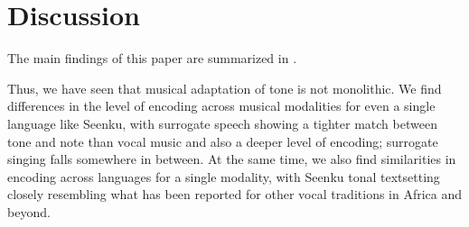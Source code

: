 \documentclass[output=paper]{langscibook}
\begin{document}
\section{Discussion}\label{sec-discussion}

The main findings of this paper are summarized in .

\begin{table}
\caption{Main findings for musical adaptation of tone\label{tab:mcpherson:Mainfindings}}
\end{table}

Thus, we have seen that musical adaptation of tone is not monolithic. We find differences in the level of encoding across musical modalities for even a single language like Seenku, with surrogate speech showing a tighter match between tone and note than vocal music and also a deeper level of encoding; surrogate singing falls somewhere in between. At the same time, we also find similarities in encoding across languages for a single modality, with Seenku tonal textsetting closely resembling what has been reported for other vocal traditions in Africa and beyond. 
\end{document}
